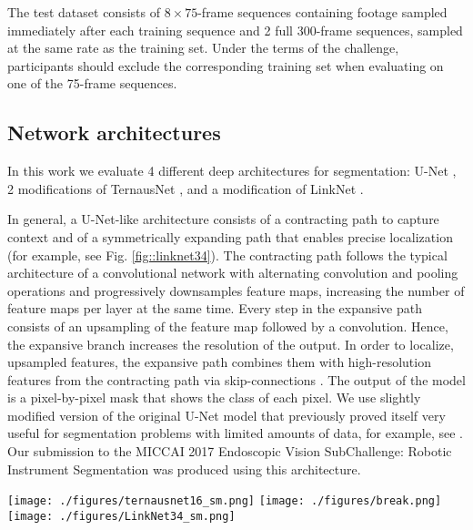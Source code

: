 \documentclass[runningheads,a4paper]{llncs}[2015/06/24]
\begin{document}
The test dataset consists of $8\times75$-frame sequences containing footage sampled immediately after each training sequence and 2 full 300-frame sequences, sampled at the same rate as the training set. Under the terms of the challenge, participants should exclude the corresponding training set when evaluating on one of the 75-frame sequences.



\subsection{Network architectures}
In this work we evaluate 4 different deep architectures for segmentation: U-Net \cite{ronneberger2015u, iglovikov2017satellite}, 2 modifications of TernausNet \cite{iglovikov2018ternausnet}, and a modification of LinkNet \cite{chaurasia2017linknet}.

In general, a U-Net-like architecture consists of a contracting path to capture context and of a symmetrically expanding path that enables precise localization (for example, see Fig. \ref{fig::linknet34}). The contracting path follows the typical architecture of a convolutional network with alternating convolution and pooling operations and progressively downsamples feature maps, increasing the number of feature maps per layer at the same time. Every step in the expansive path consists of an upsampling of the feature map followed by a convolution. Hence, the expansive branch increases the resolution of the output. In order to localize, upsampled features, the expansive path combines them with high-resolution features from the contracting path via skip-connections \cite{ronneberger2015u}. The output of the model is a pixel-by-pixel mask that shows the class of each pixel. We use slightly modified version of the original U-Net model that previously proved itself very useful for segmentation problems with limited amounts of data, for example, see \cite{iglovikov2017satellite, iglovikov2017pediatric}. Our submission to the MICCAI 2017 Endoscopic Vision SubChallenge: Robotic Instrument Segmentation \cite{miccai2017} was produced using this architecture.

\begin{figure*}[!b]
\texttt{[image: ./figures/ternausnet16\_sm.png]}
\texttt{[image: ./figures/break.png]}
\texttt{[image: ./figures/LinkNet34\_sm.png]}
\caption{These segmentation networks are based on encoder-decoder network of U-Net family. TernausNet uses pre-trained VGG16 network as an encoder, while LinkNet-34 uses pre-trained ResNet34. Each box corresponds to a multi-channel feature map. The number of channels is pointed below the box. The height of the box represents a feature map resolution. The blue arrows denote skip-connections where information is transmitted from the encoder to the decoder.}
\label{fig::linknet34}
\end{figure*}
\end{document}
